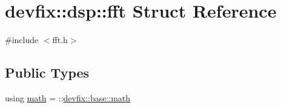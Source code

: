 \hypertarget{structdevfix_1_1dsp_1_1fft}{}\section{devfix\+:\+:dsp\+:\+:fft Struct Reference}
\label{structdevfix_1_1dsp_1_1fft}


{\ttfamily \#include $<$fft.\+h$>$}

\subsection*{Public Types}
\begin{DoxyCompactItemize}
\item 
using \hyperlink{structdevfix_1_1dsp_1_1fft_a6309eb88cede0b11f17067f8892af91a}{math} = \+::\hyperlink{structdevfix_1_1base_1_1math}{devfix\+::base\+::math}
\end{DoxyCompactItemize}

